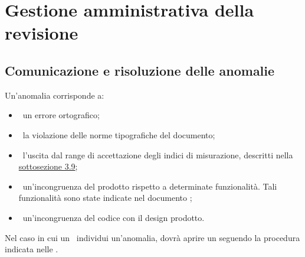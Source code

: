 
\section{Gestione amministrativa della revisione}
	\label{sec:4}
	\subsection{Comunicazione e risoluzione delle anomalie}
		Un'anomalia corrisponde a:
		\begin{itemize}
			\item\ un errore ortografico;
			\item\ la violazione delle norme tipografiche del documento;
			\item\ l'uscita dal range di accettazione degli indici di misurazione, descritti nella \hyperref[sec:3.9]{sottosezione 3.9};
			\item\ un'incongruenza del prodotto rispetto a determinate funzionalità. Tali funzionalità sono state indicate nel documento \ARdoc;
			\item\ un'incongruenza del codice con il design prodotto.
		\end{itemize}
		Nel caso in cui un \VER\ individui un'anomalia, dovrà aprire un  seguendo la procedura indicata nelle \NPdoc.